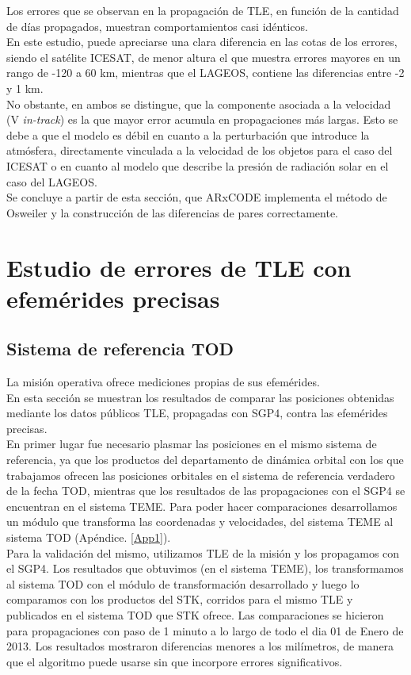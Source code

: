 Los errores que se observan en la propagaci\'on de TLE, en funci\'on de la cantidad de d\'ias propagados, muestran comportamientos casi id\'enticos.\\
En este estudio, puede apreciarse una clara diferencia en las cotas de los errores, siendo el sat\'elite ICESAT, de menor altura el que muestra errores mayores en un rango de -120 a 60 km, mientras que el LAGEOS, contiene las diferencias entre -2 y 1 km.\\
No obstante, en ambos se distingue, que la componente asociada a la velocidad (V {\it{in-track}}) es la que mayor error acumula en propagaciones m\'as largas. Esto se debe a que el modelo es d\'ebil en cuanto a la perturbaci\'on que introduce la atm\'osfera, directamente vinculada a la velocidad de los objetos para el caso del ICESAT o en cuanto al modelo que describe la presi\'on de radiaci\'on solar en el caso del LAGEOS.\\

Se concluye a partir de esta secci\'on, que ARxCODE implementa el m\'etodo de Osweiler y la construcci\'on de las diferencias de pares correctamente. 

\section{Estudio de errores de TLE con efem\'erides precisas}
\subsection*{Sistema de referencia TOD}
La misi\'on operativa ofrece mediciones propias de sus efem\'erides.\\
En esta secci\'on se muestran los resultados de comparar las posiciones obtenidas mediante los datos p\'ublicos TLE, propagadas con SGP4, contra las efem\'erides precisas.\\ 

En primer lugar fue necesario plasmar las posiciones en el mismo sistema de referencia, ya que los productos del departamento de din\'amica orbital con los que trabajamos ofrecen las posiciones orbitales en el sistema de referencia verdadero de la fecha \ac{TOD}, mientras que los resultados de las propagaciones con el SGP4 se encuentran en el sistema \ac{TEME}. Para poder hacer comparaciones desarrollamos un m\'odulo que transforma las coordenadas y velocidades, del sistema TEME al sistema TOD (Ap\'endice. \ref{App1}).\\

Para la validaci\'on del mismo, utilizamos TLE de la misi\'on y los propagamos con el SGP4. Los resultados que obtuvimos (en el sistema TEME), los transformamos al sistema TOD con el m\'odulo de transformaci\'on desarrollado y luego lo comparamos con los productos del STK, corridos para el mismo TLE y publicados en el sistema TOD que STK ofrece. Las comparaciones se hicieron para propagaciones con paso de 1 minuto a lo largo de todo el dia 01 de Enero de 2013. Los resultados mostraron diferencias menores a los mil\'imetros, de manera que el algoritmo puede usarse sin que incorpore errores significativos.\\

